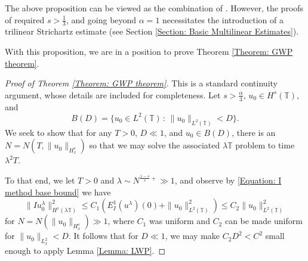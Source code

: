 \documentclass[12pt, letterpaper]{amsart}
\begin{document}
The above proposition can be viewed as the combination of \cite[Proposition 5.7, 5.10, 5.11]{schippa2024improved}. However, the proofs of \cite{schippa2024improved} required $s > \frac13$, and going beyond $\alpha = 1$ necessitates the introduction of a trilinear Strichartz estimate (see Section \ref{Section: Basic Multilinear Estimates}). 


With this proposition, we are in a position to prove Theorem \ref{Theorem: GWP theorem}. 
\begin{proof}[Proof of Theorem \ref{Theorem: GWP theorem}]
    This is a standard continuity argument, whose details are included for completeness. Let $s > \frac{\alpha}{3}$, $u_0\in H^s(\mathbb{T})$, and
    \[
    B(D) = \{u_0\in L^2(\mathbb{T})\,:\, \|u_0\|_{L^2(\mathbb{T})}< D\}.
    \]
    We seek to show that for any $T > 0$, $D\ll 1$, and $u_0\in B(D)$, there is an $N = N(T, \|u_0\|_{H^s_x})$ so that we may solve the associated $\lambda \mathbb{T}$ problem to time $\lambda^2 T$.

    To that end, we let $T > 0$ and $\lambda \sim N^{\frac{1-s}{s}+}\gg 1$, and observe by \eqref{Equation: I method base bound} we have
    \[
    \|Iu_0^{\lambda}\|_{H^1(\lambda\mathbb{T})}^2\leq C_1(E^1_I(u^\lambda)(0) + \|u_0\|_{L^2(\mathbb{T})}^2)\leq C_2\|u_0\|_{L^2(\mathbb{T})}^2
    \]
    for $N = N(\|u_0\|_{H^s_x})\gg 1$, where $C_1$ was uniform and $C_2$ can be made uniform for $\|u_0\|_{L^2_x} < D$. It follows that for $D\ll 1$, we may make $C_2D^2 < C^2$ small enough to apply Lemma \ref{Lemma: LWP}.
    

\end{proof}
\end{document}

